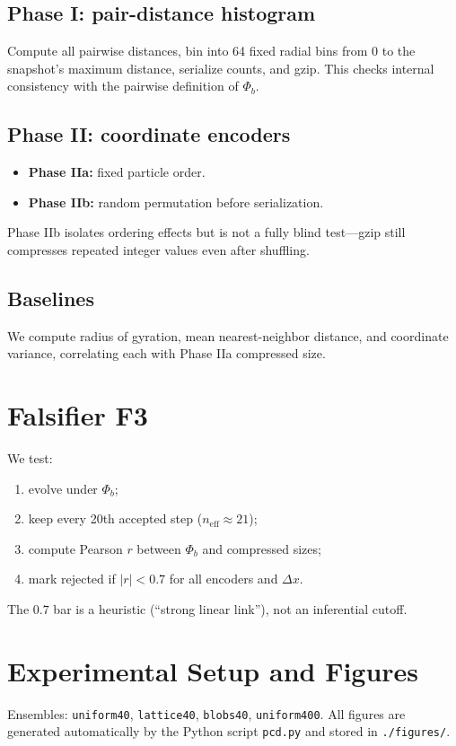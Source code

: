 \documentclass[11pt,a4paper]{article}
\numberwithin{equation}{section}
\newcommand{\phib}{\Phi_b}
\begin{document}
\subsection{Phase I: pair-distance histogram}
Compute all pairwise distances, bin into 64 fixed radial bins from $0$ to the snapshot’s maximum distance, serialize counts, and gzip.  This checks internal consistency with the pairwise definition of $\phib$.

\subsection{Phase II: coordinate encoders}
\begin{itemize}
\item \textbf{Phase IIa:} fixed particle order.
\item \textbf{Phase IIb:} random permutation before serialization.
\end{itemize}
Phase IIb isolates ordering effects but is not a fully blind test—gzip still compresses repeated integer values even after shuffling.

\subsection{Baselines}
We compute radius of gyration, mean nearest-neighbor distance, and coordinate variance, correlating each with Phase IIa compressed size.

\section{Falsifier F3}
We test:
\begin{enumerate}[label=(\alph*)]
\item evolve under $\phib$;
\item keep every 20th accepted step ($n_\text{eff}\!\approx\!21$);
\item compute Pearson $r$ between $\phib$ and compressed sizes;
\item mark rejected if $|r|<0.7$ for all encoders and $\Delta x$.
\end{enumerate}
The $0.7$ bar is a heuristic (“strong linear link”), not an inferential cutoff.

\section{Experimental Setup and Figures}
Ensembles: \texttt{uniform40}, \texttt{lattice40}, \texttt{blobs40}, \texttt{uniform400}.  
All figures are generated automatically by the Python script \texttt{pcd.py} and stored in \texttt{./figures/}.
\end{document}
